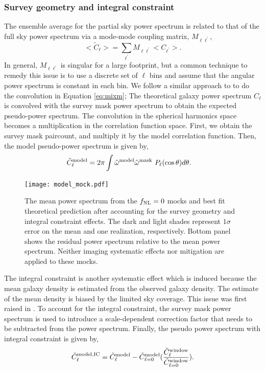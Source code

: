 \subsubsection{Survey geometry and integral constraint}
The ensemble average for the partial sky power spectrum is related to that of the full sky power spectrum via a mode-mode coupling matrix, $M_{\ell \ell^{\prime}}$,
\begin{equation}\label{eq:mixm}
    <\tilde{C}_{\ell}> = \sum_{\ell^{\prime}} M_{\ell \ell^{\prime}}<C_{\ell^{\prime}}>.
\end{equation}
In general, $M_{\ell \ell^{\prime}}$ is singular for a large footprint, but a common technique to remedy this issue is to use a discrete set of $\ell$ bins and assume that the angular power spectrum is constant in each bin. We follow a similar approach to \cite{chon2004fast} to do the convolution in Equation \ref{eq:mixm}; The theoretical galaxy power spectrum $C_{\ell}$ is convolved with the survey mask power spectrum to obtain the expected pseudo-power spectrum. The convolution in the spherical harmonics space becomes a multiplication in the correlation function space. First, we obtain the survey mask paircount, and multiply it by the model correlation function. Then, the model pseudo-power spectrum is given by,
\begin{align}
    \tilde{C}^{\rm model}_{\ell} &= 2\pi \int \hat{\omega}^{\rm model}\hat{\omega}^{\rm mask}~P_{\ell}(\cos \theta) d\theta.
\end{align}

 \begin{figure}
\centering
\texttt{[image: model\_mock.pdf]}
\caption{The mean power spectrum from the $f_{\rm NL}=0$ mocks and best fit theoretical prediction after accounting for the survey geometry and integral constraint effects. The dark and light shades represent $1\sigma$ error on the mean and one realization, respectively. Bottom panel shows the residual power spectrum relative to the mean power spectrum. Neither imaging systematic effects nor mitigation are applied to these mocks. }\label{fig:model_mock}
\end{figure}


The integral constraint is another systematic effect which is induced because the mean galaxy density is estimated from the observed galaxy density. The estimate of the mean density is biased by the limited sky coverage. This issue was first raised in \cite{peacock1991large}. To account for the integral constraint, the survey mask power spectrum is used to introduce a scale-dependent correction factor that needs to be subtracted from the power spectrum. Finally, the pseudo power spectrum with integral constraint is given by,
\begin{equation}
     \tilde{C}^{\rm model, IC}_{\ell} = \tilde{C}^{\rm model}_{\ell} - \tilde{C}^{\rm model}_{\ell=0} (\frac{\tilde{C}^{\rm window}_{\ell}}{\tilde{C}^{\rm window}_{\ell=0}}).
\end{equation}


